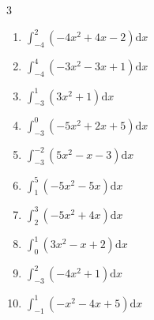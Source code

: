 


\setcounter{quesnum}{15}

\begin{multicols}{3}
\begin{enumerate}
  \itemsep=80pt
  \item $\displaystyle \int_{-4}^{2}\left( -4x^{2}+4x-2 \right) \mathrm{d}x$

        \phantom{$\displaystyle =-122$}

  \item $\displaystyle \int_{-4}^{4}\left( -3x^{2}-3x+1 \right) \mathrm{d}x$


  \item $\displaystyle \int_{-3}^{1}\left( 3x^{2}+1 \right) \mathrm{d}x$


  \item $\displaystyle \int_{-3}^{0}\left( -5x^{2}+2x+5 \right) \mathrm{d}x$


  \item $\displaystyle \int_{-3}^{-2}\left( 5x^{2}-x-3 \right) \mathrm{d}x$


\columnbreak %

  \item $\displaystyle \int_{1}^{5}\left( -5x^{2}-5x \right) \mathrm{d}x$


  \item $\displaystyle \int_{2}^{3}\left( -5x^{2}+4x \right) \mathrm{d}x$


  \item $\displaystyle \int_{0}^{1}\left( 3x^{2}-x+2 \right) \mathrm{d}x$


  \item $\displaystyle \int_{-3}^{2}\left( -4x^{2}+1 \right) \mathrm{d}x$


  \item $\displaystyle \int_{-1}^{1}\left( -x^{2}-4x+5 \right) \mathrm{d}x$


\end{enumerate}
\end{multicols}
